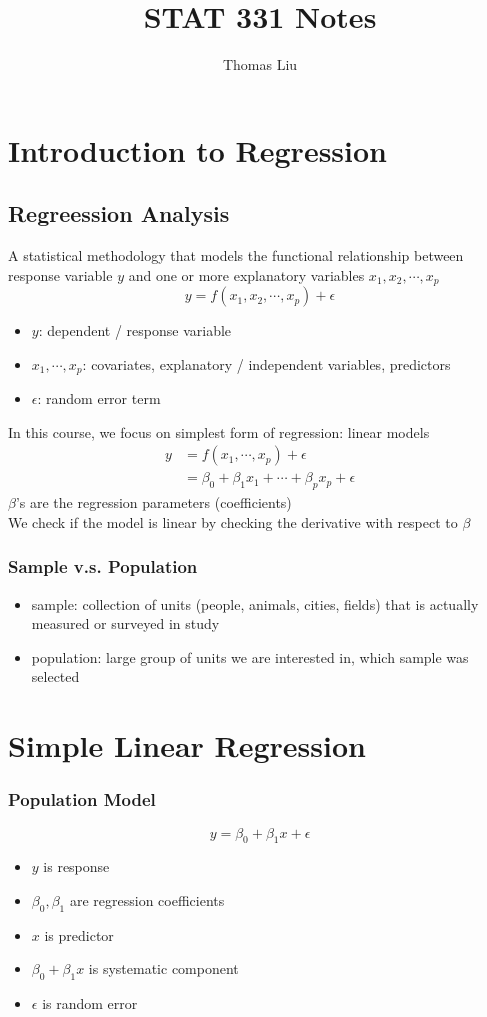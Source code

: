 \documentclass[11pt]{article}
\title{STAT 331 Notes}
\author{Thomas Liu}
\begin{document}
\maketitle
\tableofcontents

\newpage 
\section{Introduction to Regression}
\subsection{Regreession Analysis}
A statistical methodology that models the functional relationship between response variable $y$ and one or 
more explanatory variables $x_1, x_2,\cdots, x_p$
\[y=f(x_1,x_2,\cdots,x_p)+\epsilon\]
\begin{itemize}
    \item $y$: dependent / response variable
    \item $x_1,\cdots,x_p$: covariates, explanatory / independent variables, predictors
    \item $\epsilon$: random error term
\end{itemize}
In this course, we focus on simplest form of regression: linear models 
\begin{align*}
    y &= f(x_1,\cdots,x_p)+\epsilon \\
      &= \beta_0+\beta_1x_1+\cdots+\beta_px_p+\epsilon
\end{align*}
$\beta$'s are the regression parameters (coefficients) \\
We check if the model is linear by checking the derivative with respect to $\beta$
\subsubsection{Sample v.s. Population}
\begin{itemize}
    \item sample: collection of units (people, animals, cities, fields) that is actually measured or surveyed in study
    \item population: large group of units we are interested in, which sample was selected 
\end{itemize}

\section{Simple Linear Regression}
\subsubsection{Population Model}
\[y=\beta_0+\beta_1x+\epsilon\]
\begin{itemize}
    \item $y$ is response 
    \item $\beta_0,\beta_1$ are regression coefficients 
    \item $x$ is predictor 
    \item $\beta_0+\beta_1x$ is systematic component
    \item $\epsilon$ is random error
\end{itemize}
\end{document}
